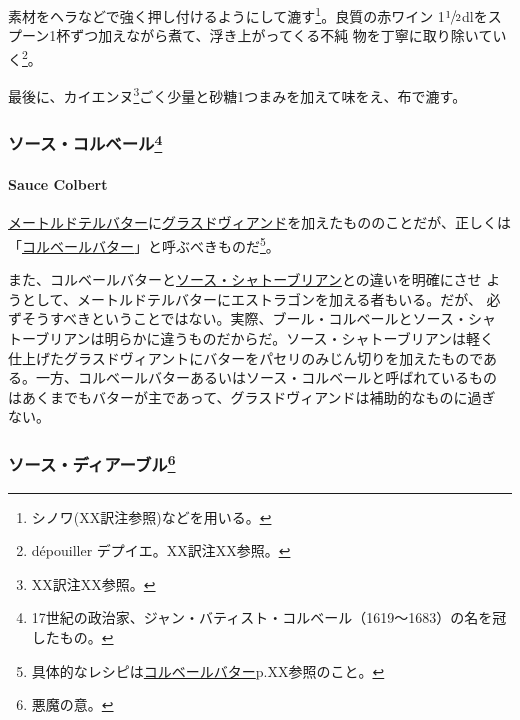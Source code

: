 素材をヘラなどで強く押し付けるようにして漉す\footnote{シノワ(XX訳注参照)などを用いる。}。良質の赤ワイン
1\(\sfrac{1}{2}\)dlをスプーン1杯ずつ加えながら煮て、浮き上がってくる不純
物を丁寧に取り除いていく\footnote{dépouiller デプイエ。XX訳注XX参照。}。

最後に、カイエンヌ\footnote{XX訳注XX参照。}ごく少量と砂糖1つまみを加えて味をえ、布で漉す。

\maeaki

\hypertarget{ux30bdux30fcux30b9ux30b3ux30ebux30d9ux30fcux30eb23}{%
\subsubsection[ソース・コルベール]{\texorpdfstring{ソース・コルベール\footnote{17世紀の政治家、ジャン・バティスト・コルベール（1619〜1683）の名を冠したもの。}}{ソース・コルベール}}\label{ux30bdux30fcux30b9ux30b3ux30ebux30d9ux30fcux30eb23}}

\hypertarget{sauce-colbert}{%
\paragraph{Sauce Colbert}\label{sauce-colbert}}


\href{}{メートルドテルバター}に\protect\hyperlink{glace-de-viande}{グラスドヴィアンド}を加えたもののことだが、正しくは「\href{}{コルベールバター}」と呼ぶべきものだ\footnote{具体的なレシピは\href{}{コルベールバター}p.XX参照のこと。}。

また、コルベールバターと\href{}{ソース・シャトーブリアン}との違いを明確にさせ
ようとして、メートルドテルバターにエストラゴンを加える者もいる。だが、
必ずそうすべきということではない。実際、ブール・コルベールとソース・シャ
トーブリアンは明らかに違うものだからだ。ソース・シャトーブリアンは軽く
仕上げたグラスドヴィアントにバターをパセリのみじん切りを加えたものであ
る。一方、コルベールバターあるいはソース・コルベールと呼ばれているもの
はあくまでもバターが主であって、グラスドヴィアンドは補助的なものに過ぎ
ない。

\maeaki

\hypertarget{ux30bdux30fcux30b9ux30c7ux30a3ux30a2ux30fcux30d6ux30eb25}{%
\subsubsection[ソース・ディアーブル]{\texorpdfstring{ソース・ディアーブル\footnote{悪魔の意。}}{ソース・ディアーブル}}\label{ux30bdux30fcux30b9ux30c7ux30a3ux30a2ux30fcux30d6ux30eb25}}

